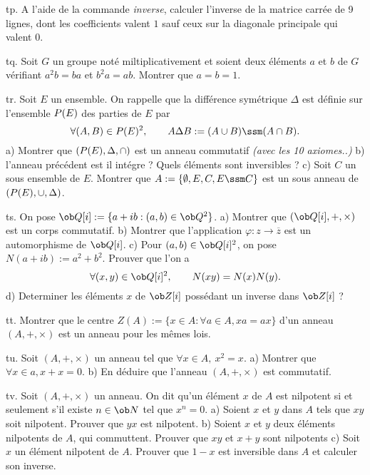 \exo [Level=1,Fight=0,Learn=0,Field=\Matrices,Type=\Maple,Origin=] tp. 
A l'aide de la commande {\it inverse}, calculer l'inverse de la matrice carrée de 9 lignes, 
dont les coefficients valent $1$ sauf ceux sur la diagonale principale qui valent $0$. 

\exo [Level=1,Fight=0,Learn=0,Field=\Groupes,Type=\Exercices,Origin=] tq. 
Soit $G$ un groupe noté miltiplicativement et soient deux éléments $a$ et $b$ de $G$ 
vérifiant $a^2b=ba$ et $b^2a=ab$. Montrer que $a=b=1$. 

\exo [Level=1,Fight=1,Learn=1,Field=\Anneaux,Type=\Exercices,Origin=] tr. 
Soit $E$ un ensemble. On rappelle que la différence symétrique $\Delta$ est définie sur 
l'ensemble $\sc P(E)$ des parties de $E$ par 
$$
\forall (A,B)\in\sc P(E)^2, \qquad A\Delta B:=(A\cup B)\ssm(A\cap B).
$$
a) Montrer que $(\sc P(E),\Delta,\cap)$ est un anneau commutatif {\it (avec les 10 axiomes..)}\pn
b) l'anneau précédent est il intégre ? Quels éléments sont inversibles ? \pn
c) Soit $C$ un sous ensemble de $E$. Montrer que $\sc A:=\{\emptyset,E, C, E\ssm C\}$ est un sous anneau de $(\sc P(E),\cup,\Delta)$. 

\exo [Level=1,Fight=2,Learn=2,Field=\Anneaux,Type=\Exercices,Origin=] ts. 
On pose $\ob Q[i]:=\{a+ib:(a,b)\in\ob Q^2\}$. \pn
a) Montrer que $(\ob Q[i],+,\times)$ est un corps commutatif. \pn
b) Montrer que l'application $\varphi:z\to\overline z$ est un automorphisme de $\ob Q[i]$. \pn
c) Pour $(a,b)\in \ob Q[i]^2$, on pose $N(a+ib):=a^2+b^2$. Prouver que l'on a 
$$
\forall (x,y)\in\ob Q[i]^2, \qquad N(xy)=N(x)N(y). 
$$ 
d) Determiner les éléments $x$ de $\ob Z[i]$ possédant un inverse dans $\ob Z[i]$ ? 

\exo [Level=1,Fight=0,Learn=0,Field=\Anneaux,Type=\Exercices,Origin=] tt. 
Montrer que le centre $Z(A):=\{x\in A:\forall a\in A, xa=ax\}$ d'un anneau $(A,+,\times)$ est un anneau pour les mêmes lois. 

\exo [Level=1,Fight=2,Learn=2,Field=\Anneaux,Type=\Exercices,Origin=] tu. 
Soit $(A,+,\times)$ un anneau tel que $\forall x\in A, \ x^2=x$. \pn
a) Montrer que $\forall x\in a, x+x=0$. \pn
b) En déduire que l'anneau $(A,+,\times)$ est commutatif. 

\exo [Level=1,Fight=2,Learn=2,Field=\Anneaux,Type=\Exercices,Origin=] tv. 
Soit $(A,+,\times)$ un anneau. On dit qu'un élément $x$ de $A$ est nilpotent si et seulement s'il existe $n\in\ob N$ tel que $x^n=0$. \pn
a) Soient $x$ et $y$ dans $A$ tels que $xy$ soit nilpotent. Prouver que $yx$ est nilpotent.  
b) Soient $x$ et $y$ deux éléments nilpotents de $A$, qui commuttent.  
Prouver que $xy$ et $x+y$ sont nilpotents\pn
c) Soit $x$ un élément nilpotent de $A$. Prouver que $1-x$ est inversible dans $A$ et calculer son inverse. 


